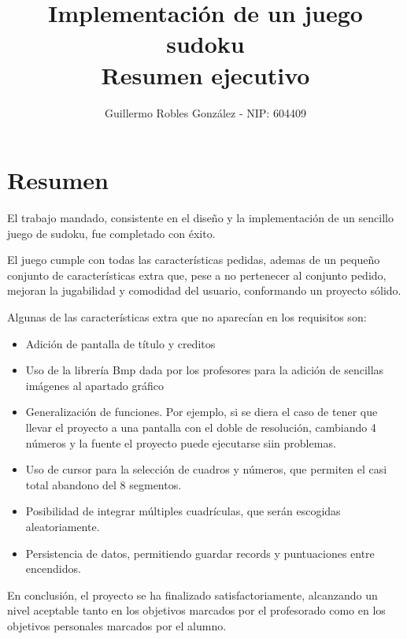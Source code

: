 \documentclass[12pt,letterpaper]{article}
\title{Implementación de un juego sudoku\\\vspace{1cm}Resumen ejecutivo}
\author{Guillermo Robles González - NIP: 604409}
\begin{document}
\maketitle

\section*{Resumen}
\label{sec:resumen}

El trabajo mandado, consistente en el diseño y la implementación de un
sencillo juego de sudoku, fue completado con éxito.

El juego cumple con todas las características pedidas, ademas de un
pequeño conjunto de características extra que, pese a no pertenecer al
conjunto pedido, mejoran la jugabilidad y comodidad del usuario,
conformando un proyecto sólido.

Algunas de las características extra que no aparecían en los
requisitos son:
\begin{itemize}
  \item Adición de pantalla de título y creditos
  \item Uso de la librería Bmp dada por los profesores para la adición
    de sencillas imágenes al apartado gráfico
  \item Generalización de funciones. Por ejemplo, si se diera el caso
    de tener que llevar el proyecto a una pantalla con el doble de
    resolución, cambiando 4 números y la fuente el proyecto puede
    ejecutarse siin problemas.
  \item Uso de cursor para la selección de cuadros y números, que
    permiten el casi total abandono del 8 segmentos.
  \item Posibilidad de integrar múltiples cuadrículas, que serán
    escogidas aleatoriamente.
  \item Persistencia de datos, permitiendo guardar records y
    puntuaciones entre encendidos.
\end{itemize}

En conclusión, el proyecto se ha finalizado satisfactoriamente,
alcanzando un nivel aceptable tanto en los objetivos marcados por el
profesorado como en los objetivos personales marcados por el alumno.
\end{document}
